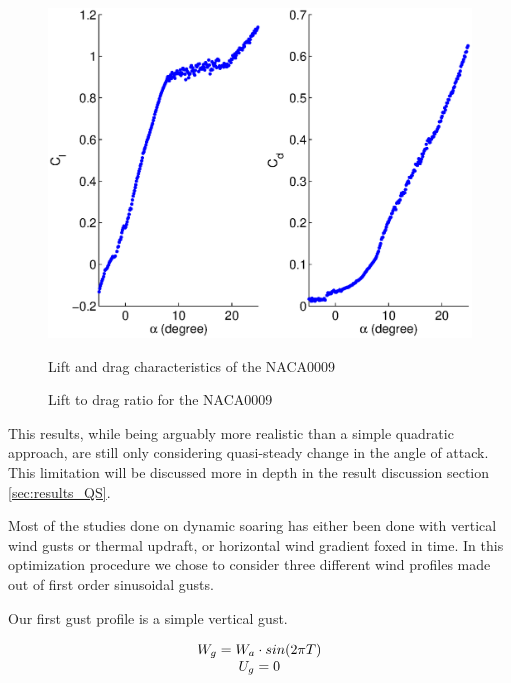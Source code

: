 \begin{figure}[ht]
  \begin{center}
    \scalebox{0.8}
    {\includegraphics{./Figures/NACA0009_steady_map_Cl_Cd.eps}} 
  \end{center}
  \caption{Lift and drag characteristics of the NACA0009}
\end{figure}


\begin{figure}[ht]
  \begin{center}
  \end{center}
  \caption{Lift to drag ratio for the NACA0009}
\end{figure}

\par This results, while being arguably more realistic than a simple quadratic approach, are still only considering quasi-steady change in the angle of attack.
This limitation will be discussed more in depth in the result discussion section \ref{sec:results_QS}.

Most of the studies done on dynamic soaring has either been done with vertical wind gusts or thermal updraft, or horizontal wind gradient foxed in time.
In this optimization procedure we chose to consider three different wind profiles made out of first order sinusoidal gusts.

\par Our first gust profile is a simple vertical gust.

\begin{equation}
  \begin{array}[c]{c}
    W_g = W_a \cdot sin(2\pi T) \\
    U_g = 0 
  \end{array}
  \label{eqn:vertical_gust_definition}
\end{equation}

